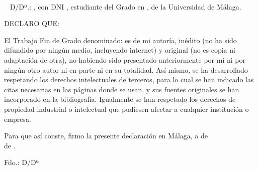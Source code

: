 \newpage~\thispagestyle{empty} 

\newpage~\thispagestyle{empty} 
D/Dª.: \underline{\hspace{12cm}}, con DNI \underline{\hspace{4cm}}, estudiante del Grado en \underline{\hspace{7.2cm}} \underline{\hspace{9cm}}, de la Universidad de Málaga. \par \vspace{\baselineskip}

DECLARO QUE: \par \vspace{\baselineskip}

El Trabajo Fin de Grado denominado: \underline{\hspace{8.3cm}} \underline{\hspace{16cm}} \underline{\hspace{16cm}} es de mi autoría, inédito (no ha sido difundido por ningún medio, incluyendo internet) y original (no es copia ni adaptación de otra), no habiendo sido presentado anteriormente por mí ni por ningún otro autor ni en parte ni en su totalidad. Así mismo, se ha desarrollado respetando los derechos intelectuales de terceros, para lo cual se han indicado las citas necesarias en las páginas donde se usan, y sus fuentes originales se han incorporado en la bibliografía. Igualmente se han respetado los derechos de propiedad industrial o intelectual que pudiesen afectar a cualquier institución o empresa. \par \vspace{\baselineskip}

Para que así conste, firmo la presente declaración en Málaga, a \underline{\hspace{1cm}} de \\ \underline{\hspace{3cm}} de \underline{\hspace{2cm}}. \par \vspace{100pt}

Fdo.: D/Dª \underline{\hspace{10cm}}



